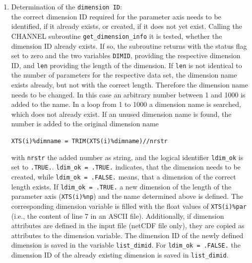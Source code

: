 \documentclass[11pt,twoside]{report}
\begin{document}
\begin{enumerate}
\item Determination of the \verb|dimension ID|:\\
the correct dimension ID required for the parameter axis needs to be identified, if it already exists, or created, if it does not yet exist.
Calling the CHANNEL subroutine \verb|get_dimension_info| it is tested, 
whether the dimension ID already exists. If so, the subroutine returns with the
 status flag set to zero and the two variables \verb|DIMID|, providing the 
respective dimension ID, and \verb|len|
providing the length of the dimension. If  \verb|len| is not 
identical to the number of parameters for the respective data set, the dimension
name exists already, but not with the correct length. Therefore the dimension
name needs to be changed. In this case an arbitrary number between 1 and 1000
is added to the name. In a loop from 1 to 1000 a dimension name is searched,
which does not already exist.
If an unused dimension name is found, the number is added to the original
dimension name

\verb|XTS(i)%dimname = TRIM(XTS(i)%dimname)//nrstr|

with \verb|nrstr| the added number as string, and the logical identifier 
\verb|ldim_ok| is set to \verb|.TRUE.|.
\verb|ldim_ok = .TRUE.| indicates, that the dimension needs to be created,
while  \verb|ldim_ok = .FALSE.| means, that a dimension of the correct 
length exists.
If \verb|ldim_ok = .TRUE.| a new dimension of the length of the
parameter axis (\verb|XTS(i)%np|) and the name determined above is defined.
The corresponding dimension variable is filled with the float values of 
\verb|XTS(i)%par| (i.e., the content of line 7 in an ASCII file).
Additionally, if dimension attributes are defined in the input file
(netCDF file only), they are copied as attributes to the dimension variable.
The dimension ID of the newly defined dimension is saved in the variable
\verb|list_dimid|. For  \verb|ldim_ok = .FALSE.| the dimension ID of the
already existing dimension is saved in \verb|list_dimid|.


\end{enumerate}
\end{document}
